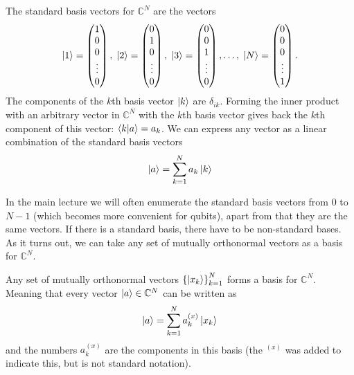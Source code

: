 \begin{def*} The standard basis vectors for $\mathbb{C}^N$ are the vectors
\begin{align*}
    \ket{1} = 
    \begin{pmatrix}
        1 \\ 0 \\ 0 \\ \vdots \\ 0
    \end{pmatrix},\;    \ket{2}= \begin{pmatrix}
        0 \\ 1 \\ 0 \\ \vdots \\ 0
    \end{pmatrix},\; \ket{3}=     \begin{pmatrix}
        0 \\ 0 \\ 1 \\ \vdots \\ 0
    \end{pmatrix},\dots, \;\ket{N}=    \begin{pmatrix}
        0 \\ 0 \\ 0 \\ \vdots \\ 1
    \end{pmatrix}.
\end{align*}
The components of the $k$th basis vector $\ket{k}$ are $\delta_{ik}$. Forming the inner product with an arbitrary vector in $\mathbb{C}^N$ with the $k$th basis vector gives back the $k$th component of this vector: $\braket{k}{a} = a_k$. We can express any vector as a linear combination of the standard basis vectors
\begin{align*}
    \ket{a} = \sum_{k=1}^N a_k \ket{k}
\end{align*}
\end{def*}
In the main lecture we will often enumerate the standard basis vectors from $0$ to $N-1$ (which becomes more convenient for qubits), apart from that they are the same vectors.
If there is a standard basis, there have to be non-standard bases.
As it turns out, we can take any set of mutually orthonormal vectors as a basis for $\mathbb{C}^N$.
\begin{def*}[basis] Any set of mutually orthonormal vectors $\left\{ \ket{x_k}\right\}_{k=1}^N$ forms a basis for $\mathbb{C}^N$. Meaning that every vector $\ket{a}\in\mathbb{C}^N$ can be written as
\begin{align*}
    \ket{a} = \sum_{k=1}^N {a}^{(x)}_k \ket{x_k}
\end{align*}
and the numbers $a^{(x)}_k$ are the components in this basis (the $^{(x)}$ was added to indicate this, but is not standard notation).
\end{def*}

